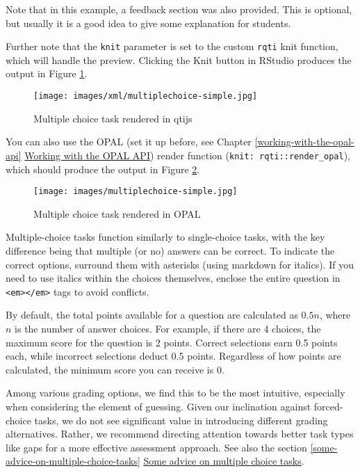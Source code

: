 \documentclass[twoside]{tufte-book}
\begin{document}
Note that in this example, a feedback section was also provided. This is optional, but usually it is a good idea to give some explanation for students.

Further note that the \texttt{knit} parameter is set to the custom \texttt{rqti} knit function, which will handle the preview. Clicking the Knit button in RStudio produces the output in Figure \ref{mpc1qtijs}.

\begin{figure}
\centering
\texttt{[image: images/xml/multiplechoice-simple.jpg]}
\caption{\label{mpc1qtijs}Multiple choice task rendered in qtijs}
\end{figure}

You can also use the OPAL (set it up before, see Chapter \ref{working-with-the-opal-api} \href{api_opal.html}{Working with the OPAL API}) render function (\texttt{knit:\ rqti::render\_opal}), which should produce the output in Figure \ref{mpc1opal}.

\begin{figure}
\centering
\texttt{[image: images/multiplechoice-simple.jpg]}
\caption{\label{mpc1opal}Multiple choice task rendered in OPAL}
\end{figure}

Multiple-choice tasks function similarly to single-choice tasks, with the key difference being that multiple (or no) answers can be correct. To indicate the correct options, surround them with asterisks (using markdown for italics). If you need to use italics within the choices themselves, enclose the entire question in \texttt{\textless{}em\textgreater{}\textless{}/em\textgreater{}} tags to avoid conflicts.

By default, the total points available for a question are calculated as \(0.5n\), where \(n\) is the number of answer choices. For example, if there are 4 choices, the maximum score for the question is 2 points. Correct selections earn 0.5 points each, while incorrect selections deduct 0.5 points. Regardless of how points are calculated, the minimum score you can receive is 0.

Among various grading options, we find this to be the most intuitive, especially when considering the element of guessing. Given our inclination against forced-choice tasks, we do not see significant value in introducing different grading alternatives. Rather, we recommend directing attention towards better task types like gaps for a more effective assessment approach. See also the section \ref{some-advice-on-multiple-choice-tasks} \hyperref[some-advice-on-multiple-choice-tasks]{Some advice on multiple choice tasks}.
\end{document}
